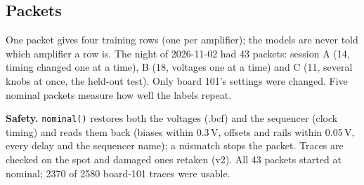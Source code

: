 \documentclass[11pt]{article}
\begin{document}
\subsection{Packets}
\begin{center}
\end{center}
One packet gives four training rows (one per amplifier); the models are never told which amplifier a row is. The night
of 2026-11-02 had 43 packets: session A (14, timing changed one at a time), B (18, voltages one at a time) and C (11,
several knobs at once, the held-out test). Only board 101's settings were changed. Five nominal packets measure how
well the labels repeat.

\textbf{Safety.} \texttt{nominal()} restores both the voltages (.bcf) and the sequencer (clock timing) and reads them
back (biases within 0.3\,V, offsets and rails within 0.05\,V, every delay and the sequencer name); a mismatch stops the
packet. Traces are checked on the spot and damaged ones retaken (v2). All 43 packets started at nominal; 2370 of 2580
board-101 traces were usable.
\end{document}
